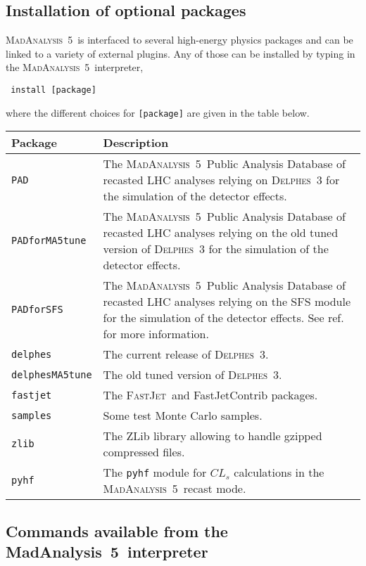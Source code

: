 \documentclass[a4paper]{article}
\newcommand{\MA}{\textsc{MadAnalysis}~5}
\newcommand{\MAnorm}{{MadAnalysis}~5}
\newcommand{\FJ}{\textsc{FastJet}}
\newcommand{\DEL}{\textsc{Delphes}}
\begin{document}
\begin{shaded}
\section{\Large Installation of optional packages}
\label{sec:install}\end{shaded}

\noindent \MA\ is interfaced to several high-energy physics packages and can be linked to
a variety of external plugins. Any of those can be installed by typing in the
\MA\ interpreter,
{\color{ao}\begin{verbatim} install [package]\end{verbatim}}
where the different choices for \verb+[package]+ are given in the table below.
\renewcommand{\arraystretch}{1.2}%
\begin{center}\begin{tabular}{l p{9.2cm}}
\hline
Package & Description\\
\hline
\color{ao} \verb?PAD?            & The \MA\ Public Analysis Database of recasted LHC
   analyses relying on \DEL~3 for the simulation of the detector effects.\\
\color{ao}\verb?PADforMA5tune?  & The \MA\ Public Analysis Database of recasted LHC
   analyses relying on the old tuned version of \DEL~3 for the simulation of the
   detector effects.\\
\color{ao}\verb?PADforSFS?  & The \MA\ Public Analysis Database of recasted LHC
analyses relying on the SFS module for the simulation of the detector effects. See ref.~\cite{Araz:2020lnp} for more information.\\
\color{ao}\verb?delphes?        & The current release of \DEL~3.\\
\color{ao}\verb?delphesMA5tune? & The old tuned version of \DEL~3.\\
\color{ao}\verb?fastjet?        & The \FJ\ and {\sc FastJetContrib} packages.\\
\color{ao}\verb?samples?        & Some test Monte Carlo samples.\\
\color{ao}\verb?zlib?           & The {\sc ZLib} library allowing to handle gzipped
                        compressed files.\\
\color{ao}\verb?pyhf?           & The \texttt{pyhf} module for $CL_s$ calculations in the \MA\ recast mode.\\
\hline
\end{tabular}
\end{center}
\vspace{2cm}
\begin{shaded}
\section{\Large Commands available from the \MAnorm\ interpreter}
\end{shaded}
\end{document}
